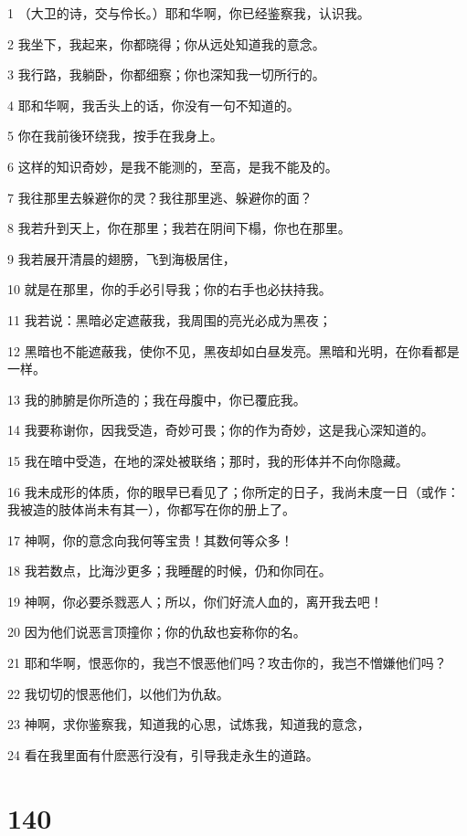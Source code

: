 \par 1 （大卫的诗，交与伶长。）耶和华啊，你已经鉴察我，认识我。
\par 2 我坐下，我起来，你都晓得；你从远处知道我的意念。
\par 3 我行路，我躺卧，你都细察；你也深知我一切所行的。
\par 4 耶和华啊，我舌头上的话，你没有一句不知道的。
\par 5 你在我前後环绕我，按手在我身上。
\par 6 这样的知识奇妙，是我不能测的，至高，是我不能及的。
\par 7 我往那里去躲避你的灵？我往那里逃、躲避你的面？
\par 8 我若升到天上，你在那里；我若在阴间下榻，你也在那里。
\par 9 我若展开清晨的翅膀，飞到海极居住，
\par 10 就是在那里，你的手必引导我；你的右手也必扶持我。
\par 11 我若说：黑暗必定遮蔽我，我周围的亮光必成为黑夜；
\par 12 黑暗也不能遮蔽我，使你不见，黑夜却如白昼发亮。黑暗和光明，在你看都是一样。
\par 13 我的肺腑是你所造的；我在母腹中，你已覆庇我。
\par 14 我要称谢你，因我受造，奇妙可畏；你的作为奇妙，这是我心深知道的。
\par 15 我在暗中受造，在地的深处被联络；那时，我的形体并不向你隐藏。
\par 16 我未成形的体质，你的眼早已看见了；你所定的日子，我尚未度一日（或作：我被造的肢体尚未有其一），你都写在你的册上了。
\par 17 神啊，你的意念向我何等宝贵！其数何等众多！
\par 18 我若数点，比海沙更多；我睡醒的时候，仍和你同在。
\par 19 神啊，你必要杀戮恶人；所以，你们好流人血的，离开我去吧！
\par 20 因为他们说恶言顶撞你；你的仇敌也妄称你的名。
\par 21 耶和华啊，恨恶你的，我岂不恨恶他们吗？攻击你的，我岂不憎嫌他们吗？
\par 22 我切切的恨恶他们，以他们为仇敌。
\par 23 神啊，求你鉴察我，知道我的心思，试炼我，知道我的意念，
\par 24 看在我里面有什麽恶行没有，引导我走永生的道路。

\chapter{140}

